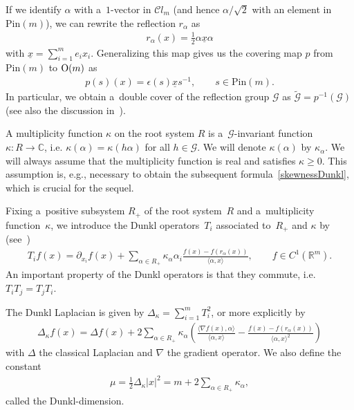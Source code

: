 \documentclass[pdftex]{sigma}
\numberwithin{equation}{section}
\numberwithin{theorem}{section}
\numberwithin{proposition}{section}
\numberwithin{lemma}{section}
\numberwithin{corollary}{section}
\numberwithin{definition}{section}
\numberwithin{example}{section}
\numberwithin{remark}{section}
\numberwithin{note}{section}
\theoremstyle{remark}
\newcommand{\mR}{\mathbb{R}}
\newcommand{\mC}{\mathbb{C}}
\newcommand{\cC}{\mathcal{C}}
\newcommand{\cG}{\mathcal{G}}
\newcommand{\ux}{\underline{x}}
\def\k{{\kappa}}
\begin{document}
If we identify $\alpha$ with a~$1$-vector in $\cC l_{m}$ (and hence $\alpha/\sqrt{2}$ with an
element in $\mathrm{Pin}(m)$), we can rewrite the ref\/lection $r_{\alpha}$ as
\begin{gather*}
r_{\alpha}(x)=\frac{1}{2}\alpha\ux\alpha
\end{gather*}
with $\ux=\sum\limits_{i=1}^{m}e_{i}x_{i}$.
Generalizing this map gives us the covering map $p$ from $\mathrm{Pin}(m)$ to ${\rm O}(m)$ as
\begin{gather*}
p(s)(x)=\epsilon(s)\ux s^{-1},\qquad s\in \mathrm{Pin}(m).
\end{gather*}
In particular, we obtain a~double cover of the ref\/lection group $\cG$ as $\widetilde{\cG}=
p^{-1}(\cG)$ (see also the discussion in~\cite{BCT}).

A multiplicity function $\kappa$ on the root system $R$ is a~$\cG$-invariant function $\kappa:R
\rightarrow\mC$, i.e.
$\k(\alpha)=\k(h\alpha)$ for all $h\in\cG$.
We will denote $\k(\alpha)$ by $\k_{\alpha}$.
We will always assume that the multiplicity function is real and satisf\/ies $\k\geq0$.
This assumption is, e.g., 
necessary to obtain the subsequent formula~\eqref{skewnessDunkl}, which is crucial for the sequel.

Fixing a~positive subsystem $R_{+}$ of the root system~$R$ and a~multiplicity function~$\k$, we
introduce the Dunkl operators~$T_{i}$ associated to~$R_{+}$ and $\k$ by (see~\cite{MR951883,
MR1827871})
\begin{gather*}
T_{i}f(x)=\partial_{x_{i}}f(x)+\sum_{\alpha\in R_{+}}\k_{\alpha}\alpha_{i}\frac{f(x)-
f(r_{\alpha}(x))}{\langle\alpha,x\rangle},\qquad f\in C^{1}(\mR^{m}).
\end{gather*}
An important property of the Dunkl operators is that they commute, i.e.
$T_{i}T_{j}=T_{j}T_{i}$.

The Dunkl Laplacian is given by $\Delta_{\k}=\sum\limits_{i=1}^{m}T_i^2$, or more explicitly by
\begin{gather*}
\Delta_{\k}f(x)=\Delta f(x)+2\sum_{\alpha\in R_{+}}\k_{\alpha}\left(\frac{\langle\nabla
f(x),\alpha\rangle}{\langle\alpha,x\rangle}-\frac{f(x)-f(r_{\alpha}(x))}{\langle\alpha,
x\rangle^{2}}\right)
\end{gather*}
with $\Delta$ the classical Laplacian and $\nabla$ the gradient operator.
We also def\/ine the constant
\begin{gather*}
\mu=\frac{1}{2}\Delta_{\k}|x|^2=m+2\sum_{\alpha\in R_+}\k_{\alpha},
\end{gather*}
called the Dunkl-dimension.
\end{document}
